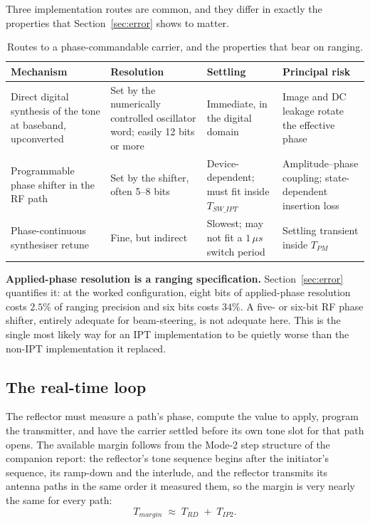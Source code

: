 \documentclass[11pt,a4paper]{article}
\newcommand{\us}{\,\ensuremath{\upmu}s}
\newcommand{\IPT}{\ensuremath{\mathrm{IPT}}}
\newcommand{\Tswipt}{T_{SW\_IPT}}
\newcommand{\Tpm}{T_{PM}}
\newcommand{\Trd}{T_{RD}}
\newcommand{\Tiptwo}{T_{IP2}}
\providecommand{\upmu}{\mu}
\begin{document}
Three implementation routes are common, and they differ in exactly the properties that
Section~\ref{sec:error} shows to matter.

\begin{table}[h]
\caption{Routes to a phase-commandable carrier, and the properties that bear on ranging.}
\label{tab:routes}
\centering\small
\begin{tabular}{@{}L{34mm}L{34mm}L{30mm}L{28mm}@{}}
\toprule
Mechanism & Resolution & Settling & Principal risk \\
\midrule
Direct digital synthesis of the tone at baseband, upconverted & Set by the numerically controlled oscillator word; easily 12 bits or more & Immediate, in the digital domain & Image and DC leakage rotate the effective phase \\
Programmable phase shifter in the RF path & Set by the shifter, often 5--8 bits & Device-dependent; must fit inside $\Tswipt$ & Amplitude--phase coupling; state-dependent insertion loss \\
Phase-continuous synthesiser retune & Fine, but indirect & Slowest; may not fit a $1\us$ switch period & Settling transient inside $\Tpm$ \\
\bottomrule
\end{tabular}
\end{table}

\begin{callout}
\textbf{Applied-phase resolution is a ranging specification.} Section~\ref{sec:error} quantifies it:
at the worked configuration, eight bits of applied-phase resolution costs $2.5\%$ of ranging
precision and six bits costs $34\%$. A five- or six-bit RF phase shifter, entirely adequate for
beam-steering, is not adequate here. This is the single most likely way for an \IPT{} implementation
to be quietly worse than the non-\IPT{} implementation it replaced.
\end{callout}

\subsection{The real-time loop}

The reflector must measure a path's phase, compute the value to apply, program the transmitter, and
have the carrier settled before its own tone slot for that path opens. The available margin follows
from the Mode-2 step structure of the companion report: the reflector's tone sequence begins after
the initiator's sequence, its ramp-down and the interlude, and the reflector transmits its antenna
paths in the same order it measured them, so the margin is very nearly the same for every path:
\begin{equation}
T_{margin} \;\approx\; \Trd \;+\; \Tiptwo .
\label{eq:margin}
\end{equation}
\end{document}
